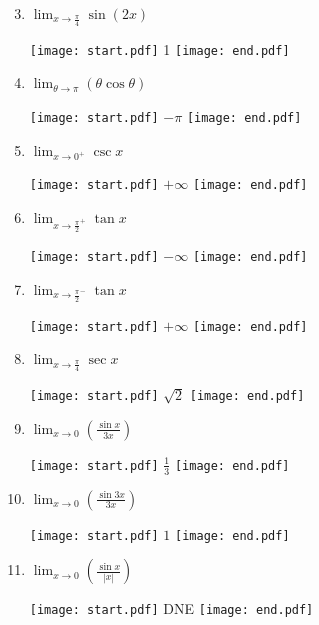 \documentclass[12pt]{article}
\begin{document}

\begin{enumerate}
\setcounter{enumi}{2}

\item  $\displaystyle \lim_{x\rightarrow \frac{\pi}{4}} \sin{(2x)}$ 

\texttt{[image: start.pdf]}
{{1}}
\texttt{[image: end.pdf]}


\item $\displaystyle \lim_{\theta \rightarrow \pi}{(\theta \cos{\theta})}$

\texttt{[image: start.pdf]}
{{$-\pi$}}
\texttt{[image: end.pdf]}


\item  $\displaystyle \lim_{x\rightarrow 0^+} \csc x$ 

\texttt{[image: start.pdf]}
{{$+\infty$}}
\texttt{[image: end.pdf]}


\item  $\displaystyle \lim_{x\rightarrow \frac{\pi}{2}^+} \tan x$ 

\texttt{[image: start.pdf]}
{{$-\infty$}}
\texttt{[image: end.pdf]}


\item  $\displaystyle \lim_{x\rightarrow \frac{\pi}{2}^-} \tan x$ 

\texttt{[image: start.pdf]}
{{$+\infty$}}
\texttt{[image: end.pdf]}


\item $\displaystyle \lim_{x \rightarrow \frac{\pi}{4}}{\sec{x}}$

\texttt{[image: start.pdf]}
{{$\sqrt{2}$}}
\texttt{[image: end.pdf]}


\item $\displaystyle \lim_{x\rightarrow 0}{\left(\frac{\sin{x}}{3x}\right)}$ 

\texttt{[image: start.pdf]}
{{$\displaystyle \frac{1}{3}$}}
\texttt{[image: end.pdf]}


\item $\displaystyle \lim_{x\rightarrow 0}{\left(\frac{\sin{3x}}{3x}\right)}$ 

\texttt{[image: start.pdf]}
{{$\displaystyle 1$}}
\texttt{[image: end.pdf]}


\item $\displaystyle \lim_{x\rightarrow 0}{\left(\frac{\sin{x}}{|x|}\right)}$

\texttt{[image: start.pdf]}
{{DNE}}
\texttt{[image: end.pdf]}



\end{enumerate}
\end{document}
